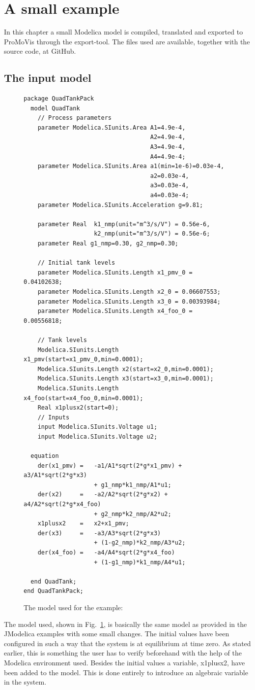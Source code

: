 \section{A small example}
In this chapter a small Modelica model is compiled, translated and exported to ProMoVis through the export-tool. The files used are available, together with the source code, at GitHub\cite{githabb}\nocite{*}.
\subsection{The input model}
\begin{figure}
\lstset{language=modelica}
\begin{lstlisting}
package QuadTankPack
  model QuadTank
    // Process parameters
	parameter Modelica.SIunits.Area A1=4.9e-4, 
									A2=4.9e-4, 
									A3=4.9e-4, 
									A4=4.9e-4;
	parameter Modelica.SIunits.Area a1(min=1e-6)=0.03e-4, 
									a2=0.03e-4, 
									a3=0.03e-4, 
									a4=0.03e-4;
	parameter Modelica.SIunits.Acceleration g=9.81;
	
	parameter Real 	k1_nmp(unit="m^3/s/V") = 0.56e-6, 
					k2_nmp(unit="m^3/s/V") = 0.56e-6;
	parameter Real g1_nmp=0.30, g2_nmp=0.30;

    // Initial tank levels
	parameter Modelica.SIunits.Length x1_pmv_0 = 0.04102638;
	parameter Modelica.SIunits.Length x2_0 = 0.06607553;
	parameter Modelica.SIunits.Length x3_0 = 0.00393984;
	parameter Modelica.SIunits.Length x4_foo_0 = 0.00556818;
	
    // Tank levels
	Modelica.SIunits.Length x1_pmv(start=x1_pmv_0,min=0.0001);
	Modelica.SIunits.Length x2(start=x2_0,min=0.0001);
	Modelica.SIunits.Length x3(start=x3_0,min=0.0001);
	Modelica.SIunits.Length x4_foo(start=x4_foo_0,min=0.0001);
	Real x1plusx2(start=0);
	// Inputs
	input Modelica.SIunits.Voltage u1;
	input Modelica.SIunits.Voltage u2;

  equation    
    der(x1_pmv) = 	-a1/A1*sqrt(2*g*x1_pmv) + a3/A1*sqrt(2*g*x3) 
					+ g1_nmp*k1_nmp/A1*u1;						
	der(x2) 	= 	-a2/A2*sqrt(2*g*x2) + a4/A2*sqrt(2*g*x4_foo)
					+ g2_nmp*k2_nmp/A2*u2;
	x1plusx2	=	x2+x1_pmv;
	der(x3) 	= 	-a3/A3*sqrt(2*g*x3) 
					+ (1-g2_nmp)*k2_nmp/A3*u2;
	der(x4_foo) = 	-a4/A4*sqrt(2*g*x4_foo) 
					+ (1-g1_nmp)*k1_nmp/A4*u1;

  end QuadTank;
end QuadTankPack;
\end{lstlisting}
\caption{The model used for the example:}
\label{fig:exfile}
\end{figure} 
The model used, shown in Fig.~\ref{fig:exfile}, is basically the same model as provided in the JModelica examples with some small changes. The initial values have been configured in such a way that the system is at equilibrium at time zero. As stated earlier, this is something the user has to verify beforehand with the help of the Modelica environment used. Besides the initial values a variable, x1plusx2, have been added to the model. This is done entirely to introduce an algebraic variable in the system.
